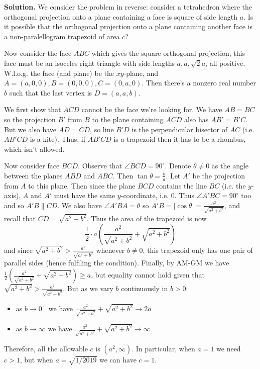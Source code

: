 \documentclass[11pt,a4paper]{article}
\begin{document}
\begin{enumerate}
    \textbf{Solution.} 
    We consider the problem in reverse: 
    consider a tetrahedron where the orthogonal projection onto a plane containing a face is 
    square of side length $a$. 
    Is it possible that the orthogonal projection onto a plane containing another face is a non-paralellogram trapezoid of area $c$? 
    
    Now consider the face $ABC$ which gives the square orthogonal projection, 
    this face must be an isoceles right triangle with side lengths $a, a, \sqrt{2}a$, all positive. 
    W.l.o.g. the face (and plane) be the $xy$-plane, 
    and $A=(a, 0, 0), B=(0, 0, 0), C=(0, a, 0)$. 
    Then there's a nonzero real number $b$ such that the last vertex is $D=(a, a, b)$.
    
    We first show that $ACD$ cannot be the face we're looking for. 
    We have $AB=BC$ so the projection $B'$ from $B$ to the plane containing $ACD$ also has $AB'=B'C$. 
    But we also have $AD=CD$, 
    so line $B'D$ is the perpendicular bisector of $AC$ (i.e. $AB'CD$ is a kite). 
    Thus, if $AB'CD$ is a trapezoid then it has to be a rhombus, which isn't allowed. 
    
    Now consider face $BCD$. 
    Observe that $\angle BCD=90^{\circ}$. 
    Denote $\theta\neq 0$ as the angle between the planes $ABD$ and $ABC$. 
    Then $\tan\theta = \frac{b}{a}$. 
    Let $A'$ be the projection from $A$ to this plane. 
    Then since the plane $BCD$ contains the line $BC$ (i.e. the $y$-axis), 
    $A$ and $A'$ must have the same $y$-coordinate, i.e. 0. 
    Thus $\angle A'BC=90^{\circ}$ too and so $A'B\parallel CD$. 
    We also have $\angle A'BA=\theta$ so $A'B = |\cos\theta| = \frac{a^2}{\sqrt{a^2+b^2}}$, 
    and recall that $CD=\sqrt{a^2+b^2}$. 
    Thus the area of the trapezoid is now 
    \[
    \frac 12 \cdot a(\frac{a^2}{\sqrt{a^2+b^2}} + \sqrt{a^2+b^2})
    \]
    and since $\sqrt{a^2+b^2}>\frac{a^2}{\sqrt{a^2+b^2}}$ whenever $b\neq 0$, 
    this trapezoid only has one pair of parallel sides (hence fulfiling the condition). 
    Finally, by AM-GM we have $\frac 12 (\frac{a^2}{\sqrt{a^2+b^2}} + \sqrt{a^2+b^2})\ge a$, 
    but equality cannot hold given that $\sqrt{a^2+b^2}>\frac{a^2}{\sqrt{a^2+b^2}}$. 
    But as we vary $b$ continuously in $b>0$: 
    \begin{itemize}
    	\item as $b\to 0^+$ we have $\frac{a^2}{\sqrt{a^2+b^2}} + \sqrt{a^2+b^2}\to 2a$
    	\item as $b\to\infty$ we have $\frac{a^2}{\sqrt{a^2+b^2}} + \sqrt{a^2+b^2}\to \infty$
    \end{itemize}
    Therefore, all the allowable $c$ is $(a^2, \infty)$. 
    In particular, when $a=1$ we need $c>1$, but when $a=\sqrt{1/2019}$ we can have $c=1$. 

\end{enumerate}
\end{document}
